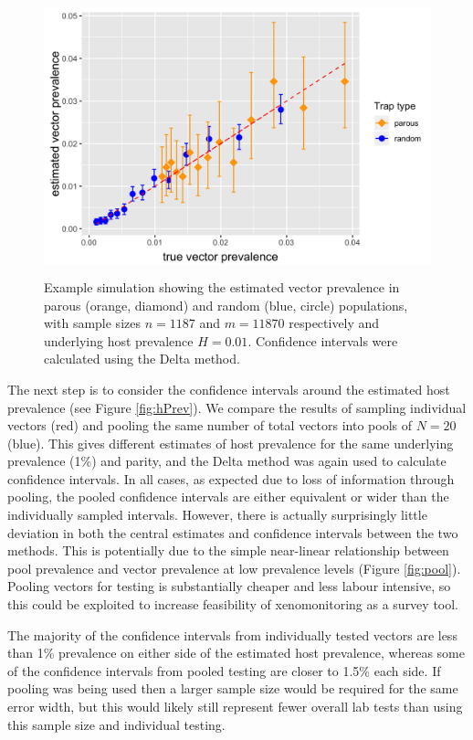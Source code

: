 \begin{figure}[ht]
\begin{center}
\includegraphics[height=8cm]{Project/Figures/Xeno/VPrevEst.png}
\end{center}
\caption[Estimated vector prevalence (parous and random).]{Example simulation showing the estimated vector prevalence in parous (orange, diamond) and random (blue, circle) populations, with sample sizes $n=1187$ and $m=11870$ respectively and underlying host prevalence $H=0.01$. Confidence intervals were calculated using the Delta method.}
\label{fig:vPrev}
\end{figure}

The next step is to consider the confidence intervals around the estimated host prevalence (see Figure \ref{fig:hPrev}). We compare the results of sampling individual vectors (red) and pooling the same number of total vectors into pools of $N=20$ (blue). This gives different estimates of host prevalence for the same underlying prevalence (1\%) and parity, and the Delta method was again used to calculate confidence intervals. In all cases, as expected due to loss of information through pooling, the pooled confidence intervals are either equivalent or wider than the individually sampled intervals. However, there is actually surprisingly little deviation in both the central estimates and confidence intervals between the two methods. This is potentially due to the simple near-linear relationship between pool prevalence and vector prevalence at low prevalence levels (Figure \ref{fig:pool}). Pooling vectors for testing is substantially cheaper and less labour intensive, so this could be exploited to increase feasibility of xenomonitoring as a survey tool.

The majority of the confidence intervals from individually tested vectors are less than 1\% prevalence on either side of the estimated host prevalence, whereas some of the confidence intervals from pooled testing are closer to 1.5\% each side. If pooling was being used then a larger sample size would be required for the same error width, but this would likely still represent fewer overall lab tests than using this sample size and individual testing.

